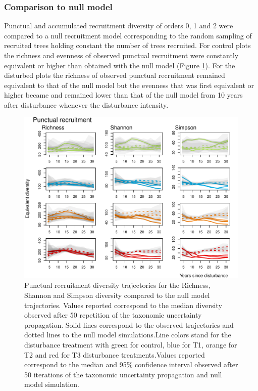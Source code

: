 \documentclass[fleqn,10pt]{ArtEcoFoG} %
\begin{document}
\subsubsection{Comparison to null model}\label{comparison-to-null-model}

Punctual and accumulated recruitment diversity of orders 0, 1 and 2 were
compared to a null recruitment model corresponding to the random
sampling of recruited trees holding constant the number of trees
recruited. For control plots the richness and evenness of observed
punctual recruitment were constantly equivalent or higher than obtained
with the null model (Figure \ref{fig:Fig2}). For the disturbed plots the
richness of observed punctual recruitment remained equivalent to that of
the null model but the evenness that was first equivalent or higher
became and remained lower than that of the null model from 10 years
after disturbance whenever the disturbance intensity.

\begin{figure}

{\centering \includegraphics[width=0.8\linewidth]{RecruitmentTrajectories_files/figure-latex/Fig2-1} 

}

\caption{Punctual recruitment diversity trajectories for the Richness, Shannon and Simpson diversity compared to the null model trajectories. Values reported correspond to the median diversity observed after 50 repetition of the taxonomic uncertainty propagation. Solid lines correspond to the observed trajectories and dotted lines to the null model simulations.Line colors stand for the disturbance treatment with green for control, blue for T1, orange for T2 and red for T3 disturbance treatments.Values reported correspond to the median and 95\% confidence interval observed after 50 iterations of the taxonomic uncertainty propagation and null model simulation.}\label{fig:Fig2}
\end{figure}
\end{document}
